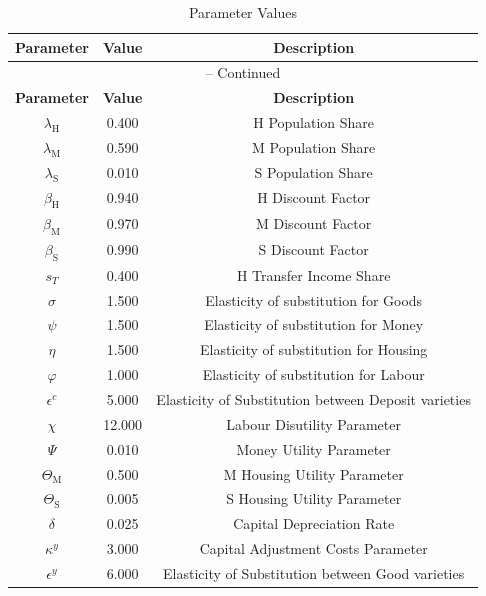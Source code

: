 \begin{center}
\begin{longtable}{ccc}
\caption{Parameter Values}\\%
\toprule%
\multicolumn{1}{c}{\textbf{Parameter}} &
\multicolumn{1}{c}{\textbf{Value}} &
 \multicolumn{1}{c}{\textbf{Description}}\\%
\midrule%
\endfirsthead
\multicolumn{3}{c}{{\tablename} \thetable{} -- Continued}\\%
\midrule%
\multicolumn{1}{c}{\textbf{Parameter}} &
\multicolumn{1}{c}{\textbf{Value}} &
  \multicolumn{1}{c}{\textbf{Description}}\\%
\midrule%
\endhead
$\lambda_\mathrm{H}$ 	 & 	 0.400 	 & 	 H Population Share\\
$\lambda_\mathrm{M}$ 	 & 	 0.590 	 & 	 M Population Share\\
$\lambda_\mathrm{S}$ 	 & 	 0.010 	 & 	 S Population Share\\
$\beta_\mathrm{H}$ 	 & 	 0.940 	 & 	 H Discount Factor\\
$\beta_\mathrm{M}$ 	 & 	 0.970 	 & 	 M Discount Factor\\
$\beta_\mathrm{S}$ 	 & 	 0.990 	 & 	 S Discount Factor\\
$s_T$ 	 & 	 0.400 	 & 	 H Transfer Income Share\\
$\sigma$ 	 & 	 1.500 	 & 	 Elasticity of substitution for Goods\\
$\psi$ 	 & 	 1.500 	 & 	 Elasticity of substitution for Money\\
$\eta$ 	 & 	 1.500 	 & 	 Elasticity of substitution for Housing\\
$\varphi$ 	 & 	 1.000 	 & 	 Elasticity of substitution for Labour\\
$\epsilon^c$ 	 & 	 5.000 	 & 	 Elasticity of Substitution between Deposit varieties\\
$\chi$ 	 & 	 12.000 	 & 	 Labour Disutility Parameter\\
$\Psi$ 	 & 	 0.010 	 & 	 Money Utility Parameter\\
$\Theta_\mathrm{M}$ 	 & 	 0.500 	 & 	 M Housing Utility Parameter\\
$\Theta_\mathrm{S}$ 	 & 	 0.005 	 & 	 S Housing Utility Parameter\\
$\delta$ 	 & 	 0.025 	 & 	 Capital Depreciation Rate\\
$\kappa^y$ 	 & 	 3.000 	 & 	 Capital Adjustment Costs Parameter\\
$\epsilon^y$ 	 & 	 6.000 	 & 	 Elasticity of Substitution between Good varieties\\

\end{longtable}
\end{center}
